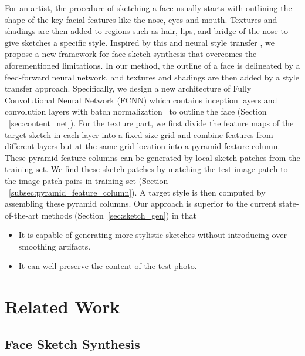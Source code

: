 \documentclass[10pt,twocolumn,letterpaper]{article}
\begin{document}
For an artist, the procedure of sketching a face usually starts with outlining the shape of the key facial features like the nose, eyes and mouth. Textures and shadings are then added to regions such as hair, lips, and bridge of the nose to give sketches a specific style. Inspired by this and neural style transfer \cite{gatys2015texture}, we propose a new framework for face sketch synthesis that overcomes the aforementioned limitations. In our method, the outline of a face is delineated by a feed-forward neural network, and textures and shadings are then added by a style transfer approach. Specifically, we design a new architecture of Fully Convolutional Neural Network (FCNN) which contains inception layers \cite{szegedy2015going} and convolution layers with batch normalization~\cite{Sergey2015batch} to outline the face (Section ~\ref{sec:content_net}). For the texture part, we first divide the feature maps of the target sketch in each layer into a fixed size grid and combine features from different layers but at the same grid location into a pyramid feature column. These pyramid feature columns can be generated by local sketch patches from the training set. We find these sketch patches by matching the test image patch to the image-patch pairs in training set (Section ~\ref{subsec:pyramid_feature_column}). A target style is then computed by assembling these pyramid columns. Our approach is superior to the current state-of-the-art methods (Section~\ref{sec:sketch_gen}) in that
\begin{itemize}
\item It is capable of generating more stylistic sketches without introducing over smoothing artifacts.
\item It can well preserve the content of the test photo.
\end{itemize}

\section{Related Work}\label{sec:related_work}

\subsection{Face Sketch Synthesis}
\end{document}
